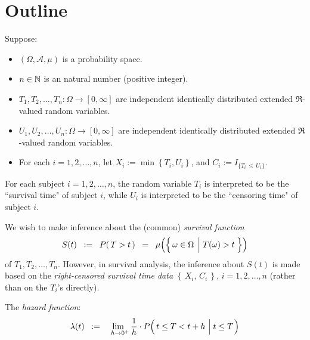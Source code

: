 

\section{Outline}
\setcounter{theorem}{0}
\setcounter{equation}{0}

\renewcommand{\theenumi}{\roman{enumi}}
\renewcommand{\labelenumi}{\textnormal{(\theenumi)}$\;\;$}


Suppose:
\begin{itemize}
\item	$\left(\Omega,\mathcal{A},\mu\right)$ is a probability space.
\item	$n \in \mathbb{N}$ is an natural number (positive integer).
\item	$T_{1},T_{2},\ldots,T_{n} : \Omega \longrightarrow [0,\infty]$ are
		independent identically distributed
		extended $\Re$-valued random variables.
\item	$U_{1},U_{2},\ldots,U_{n} : \Omega \longrightarrow [0,\infty]$ are
		independent identically distributed
		extended $\Re$-valued random variables.
\item	For each $i = 1,2,\ldots, n$,
		let $X_{i} := \min\!\left\{T_{i},U_{i}\right\}$, and $C_{i} := I_{\{T_{i}\,\leq\,U_{i}\}}$.
\end{itemize}
For each subject $i = 1, 2, \ldots, n$,
the random variable $T_{i}$ is interpreted to be the ``survival time" of subject $i$,
while $U_{i}$ is interpreted to be the ``censoring time" of subject $i$.

\vskip 0.5cm
\noindent
We wish to make inference about the (common) \textit{survival function}
\begin{equation*}
S(t)
\;\; := \;\; P\!\left(\,T > t\,\right)
\;\; = \;\; \mu\!\left(\left\{\,\omega\in\Omega\;\left\vert\;T(\omega) \overset{{\color{white}.}}{>} t\,\right.\right\}\right)
\end{equation*}
of $T_{1}, T_{2}, \ldots, T_{n}$.
However, in survival analysis, the inference about $S(t)$ is made
based on the \textit{right-censored survival time data}
$\left\{\,X_{i},\,C_{i}\,\right\}$, $i = 1, 2, \ldots, n$
(rather than on the $T_{i}$'s directly).

\vskip 0.5cm
\noindent
The \textit{hazard function}:
\begin{equation*}
\lambda(t)
\;\; := \;\;
	\underset{\mbox{}\;\;h\rightarrow0^{+}}{\lim}\,
	\dfrac{1}{h}\cdot P\!\left(\,t \leq T < t + h\,\left\vert\;t\overset{{\color{white}.}}{\leq}T\right.\right)
\end{equation*}

